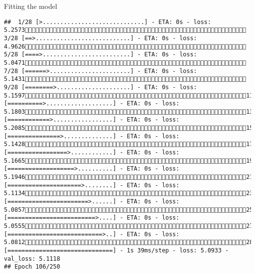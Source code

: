 \documentclass[
  ignorenonframetext,
]{beamer}
\begin{document}
\begin{frame}[fragile]{Fitting the model}
\begin{verbatim}
##  1/28 [>.............................] - ETA: 0s - loss: 5.2573 3/28 [==>...........................] - ETA: 0s - loss: 4.9626 5/28 [====>.........................] - ETA: 0s - loss: 5.0471 7/28 [======>.......................] - ETA: 0s - loss: 5.1431 9/28 [========>.....................] - ETA: 0s - loss: 5.159711/28 [==========>...................] - ETA: 0s - loss: 5.180313/28 [============>.................] - ETA: 0s - loss: 5.208515/28 [===============>..............] - ETA: 0s - loss: 5.142817/28 [=================>............] - ETA: 0s - loss: 5.166519/28 [===================>..........] - ETA: 0s - loss: 5.194621/28 [=====================>........] - ETA: 0s - loss: 5.113423/28 [=======================>......] - ETA: 0s - loss: 5.085725/28 [=========================>....] - ETA: 0s - loss: 5.055527/28 [===========================>..] - ETA: 0s - loss: 5.081228/28 [==============================] - 1s 39ms/step - loss: 5.0933 - val_loss: 5.1118
## Epoch 106/250

\end{verbatim}
\end{frame}
\end{document}
